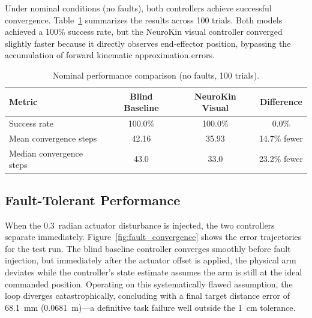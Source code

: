 \documentclass[12pt,a4paper,oneside]{report}
\begin{document}
Under nominal conditions (no faults), both controllers achieve successful convergence. Table~\ref{tab:nominal_performance} summarizes the results across 100 trials. Both models achieved a 100\% success rate, but the NeuroKin visual controller converged slightly faster because it directly observes end-effector position, bypassing the accumulation of forward kinematic approximation errors.
\begin{table}[H]
\centering

\caption{Nominal performance comparison (no faults, 100 trials).}
\label{tab:nominal_performance}
\begin{tabular}{lccc}
\toprule

\textbf{Metric} & \textbf{Blind Baseline} & \textbf{NeuroKin Visual} & \textbf{Difference} \\
\midrule

Success rate & 100.0\% & 100.0\% & 0.0\% \\

Mean convergence steps & 42.16 & 35.93 & 14.7\% fewer \\

Median convergence steps & 43.0 & 33.0 & 23.2\% fewer \\
\bottomrule

\end{tabular}
\end{table}
\subsection{Fault-Tolerant Performance}
\label{subsec:fault_tolerant_performance}

When the 0.3~radian actuator disturbance is injected, the two controllers separate immediately. Figure~\ref{fig:fault_convergence} shows the error trajectories for the test run. The blind baseline controller converges smoothly before fault injection, but immediately after the actuator offset is applied, the physical arm deviates while the controller's state estimate assumes the arm is still at the ideal commanded position. Operating on this systematically flawed assumption, the loop diverges catastrophically, concluding with a final target distance error of 68.1~mm (0.0681~m)---a definitive task failure well outside the 1~cm tolerance.
\end{document}
